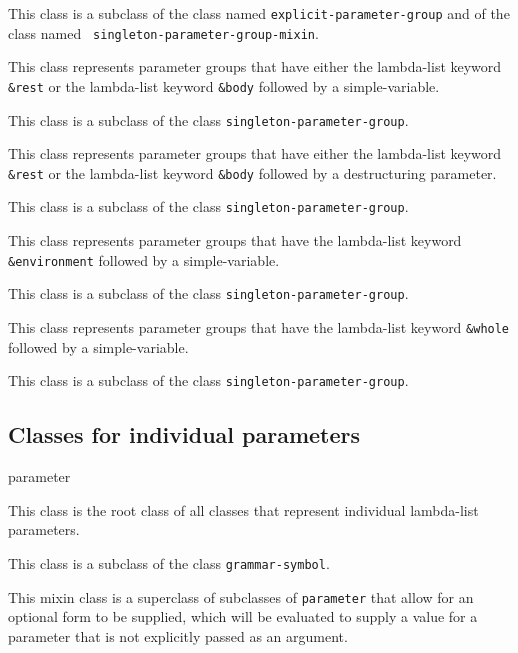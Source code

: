 This class is a subclass of the class named
\texttt{explicit-parameter-group} and of the class named \texttt{
  singleton-parameter-group-mixin}.


This class represents parameter groups that have either the
lambda-list keyword \texttt{\&rest} or the lambda-list keyword
\texttt{\&body} followed by a simple-variable.

This class is a subclass of the class \texttt{singleton-parameter-group}.


This class represents parameter groups that have either the
lambda-list keyword \texttt{\&rest} or the lambda-list keyword
\texttt{\&body} followed by a destructuring parameter.

This class is a subclass of the class \texttt{singleton-parameter-group}.


This class represents parameter groups that have the lambda-list
keyword \texttt{\&environment} followed by a simple-variable.

This class is a subclass of the class \texttt{singleton-parameter-group}.


This class represents parameter groups that have the lambda-list
keyword \texttt{\&whole} followed by a simple-variable.

This class is a subclass of the class \texttt{singleton-parameter-group}.

\subsection{Classes for individual parameters}

 {parameter}


This class is the root class of all classes that represent individual
lambda-list parameters.

This class is a subclass of the class \texttt{grammar-symbol}.


This mixin class is a superclass of subclasses of \texttt{parameter}
that allow for an optional form to be supplied, which will be
evaluated to supply a value for a parameter that is not explicitly
passed as an argument.

